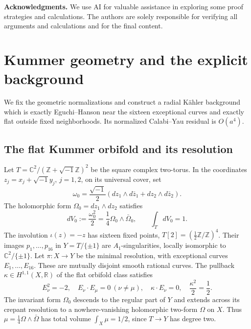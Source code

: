 \documentclass[11pt,a4paper,twoside]{article}
\numberwithin{equation}{section}
\theoremstyle{definition}
\theoremstyle{remark}
\newcommand{\ii}{\sqrt{-1}}
\begin{document}
{\bfseries Acknowledgments.} 
We use AI for valuable assistance in exploring some proof strategies and calculations. 
The authors are solely responsible for verifying all arguments and calculations and for the final content.

\section{Kummer geometry and the explicit background}
\label{sec:kummer-geometry}
We fix the geometric normalizations and construct a radial K\"ahler
background which is exactly Eguchi--Hanson near the sixteen
exceptional curves and exactly flat outside fixed neighborhoods.
Its normalized Calabi--Yau residual is \(O(a^4)\).

\subsection{The flat Kummer orbifold and its resolution}
\label{subsec:kummer-orbifold}
Let \(T=\mathbb C^2/(\mathbb Z+\ii\mathbb Z)^2\) be the square
complex two-torus. In the coordinates \(z_j=x_j+\ii y_j\),
\(j=1,2\), on its universal cover, set
\begin{equation}\label{eq:flat-kahler-form}
\omega_0=\frac{\ii}{2}
\left(dz_1\wedge d\bar z_1+dz_2\wedge d\bar z_2\right).
\end{equation}
The holomorphic form \(\Omega_0=dz_1\wedge dz_2\) satisfies
\begin{equation}\label{eq:flat-volume-identity}
dV_0:=\frac{\omega_0^2}{2}=\frac14\Omega_0\wedge\bar\Omega_0,
\qquad \int_TdV_0=1.
\end{equation}
The involution \(\iota(z)=-z\) has sixteen fixed points,
\(T[2]=(\frac12\mathbb Z/\mathbb Z)^4\). Their images
\(p_1,\ldots,p_{16}\) in \(Y=T/\{\pm1\}\) are
\(A_1\)-singularities, locally isomorphic to
\(\mathbb C^2/\{\pm1\}\). Let \(\pi:X\to Y\) be the minimal
resolution, with exceptional curves \(E_1,\ldots,E_{16}\).
These are mutually disjoint smooth rational curves. The pullback
\(\kappa\in H^{1,1}(X,\mathbb R)\) of the flat orbifold class
satisfies
\begin{equation}\label{eq:intersection-normalizations}
E_\nu^2=-2,\quad E_\nu\cdot E_\mu=0\ (\nu\ne\mu),
\quad \kappa\cdot E_\nu=0,\quad \frac{\kappa^2}{2}=\frac12.
\end{equation}
The invariant form \(\Omega_0\) descends to the regular part
of \(Y\) and extends across its crepant resolution to a
nowhere-vanishing holomorphic two-form \(\Omega\) on \(X\).
Thus \(\mu=\frac14\Omega\wedge\bar\Omega\) has total volume
\(\int_X\mu=1/2\), since \(T\to Y\) has degree two.
\end{document}
